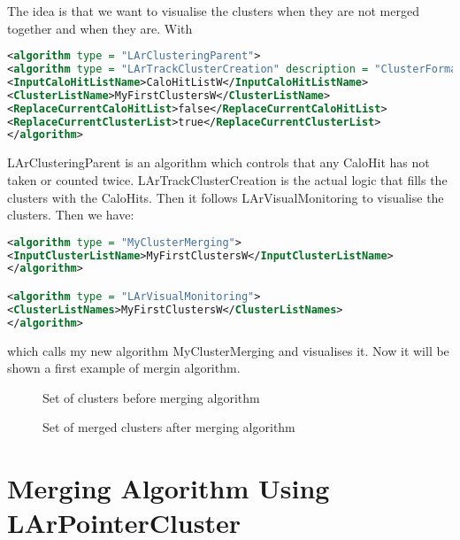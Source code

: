 The idea is that we want to visualise the clusters when they are not merged together and when they are. With

\begin{lstlisting}[language=XML]
<algorithm type = "LArClusteringParent">
<algorithm type = "LArTrackClusterCreation" description = "ClusterFormation"/>
<InputCaloHitListName>CaloHitListW</InputCaloHitListName>
<ClusterListName>MyFirstClustersW</ClusterListName>
<ReplaceCurrentCaloHitList>false</ReplaceCurrentCaloHitList>
<ReplaceCurrentClusterList>true</ReplaceCurrentClusterList>
</algorithm>
\end{lstlisting}

LArClusteringParent is an algorithm which controls that any CaloHit has not taken or counted twice. LArTrackClusterCreation is the actual logic that fills the clusters with the CaloHits. Then it follows LArVisualMonitoring to visualise the clusters. Then we have:  

\begin{lstlisting}[language=XML]
<algorithm type = "MyClusterMerging">
<InputClusterListName>MyFirstClustersW</InputClusterListName>
</algorithm>

<algorithm type = "LArVisualMonitoring"> 
<ClusterListNames>MyFirstClustersW</ClusterListNames> 
</algorithm> 
\end{lstlisting}
which calls my new algorithm MyClusterMerging and visualises it. Now it will be shown a first example of mergin algorithm.
\begin{figure}[h]
\centering
\caption{Set of clusters before merging algorithm}
\label{fig:cluster1}
\end{figure}
\begin{figure}[h]
\centering
\caption{Set of merged clusters after merging algorithm}
\label{fig:cluster2}
\end{figure}

\section{Merging Algorithm Using LArPointerCluster} \label{sssec:larpointer_cluster}


